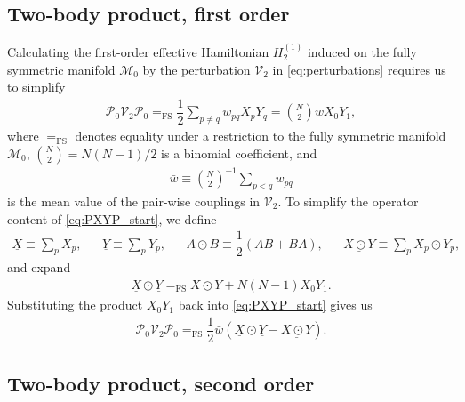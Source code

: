 \documentclass[nofootinbib,notitlepage,11pt]{revtex4-2}
\newcommand{\f}[2]{\dfrac{#1}{#2}} %
\newcommand{\p}[1]{\left(#1\right)} %
\newcommand{\1}{\mathds{1}}
\newcommand{\M}{\mathcal{M}}
\renewcommand{\P}{\mathcal{P}}
\newcommand{\V}{\mathcal{V}}
\newcommand{\EQFS}{=_{\text{FS}}}
\newcommand{\col}{\underline}
\begin{document}
\subsection{Two-body product, first order}
\label{sec:PXYP}

Calculating the first-order effective Hamiltonian $H_2^{(1)}$ induced
on the fully symmetric manifold $\M_0$ by the perturbation $\V_2$ in
\eqref{eq:perturbations} requires us to simplify
\begin{align}
  \P_0 \V_2 \P_0
  \EQFS \f12 \sum_{p\ne q} w_{pq} X_p Y_q
  = {N\choose 2} \bar w X_0 Y_1,
  \label{eq:PXYP_start}
\end{align}
where $\EQFS$ denotes equality under a restriction to the fully
symmetric manifold $\M_0$, ${N\choose2}=N\p{N-1}/2$ is a binomial
coefficient, and
\begin{align}
  \bar w \equiv {N\choose 2}^{-1} \sum_{p<q} w_{pq}
\end{align}
is the mean value of the pair-wise couplings in $\V_2$.  To simplify
the operator content of \eqref{eq:PXYP_start}, we define
\begin{align}
  \col{X} \equiv \sum_p X_p,
  &&
  \col{Y} \equiv \sum_p Y_p,
  &&
  A \odot B \equiv \f12\p{AB+BA},
  &&
  \col{X\odot Y} \equiv \sum_p X_p \odot Y_p,
\end{align}
and expand
\begin{align}
  \col{X}\odot\col{Y} \EQFS \col{X\odot Y} + N\p{N-1} X_0 Y_1.
\end{align}
Substituting the product $X_0 Y_1$ back into \eqref{eq:PXYP_start}
gives us
\begin{align}
  \P_0 \V_2 \P_0
  \EQFS \f12 \bar w \p{\col{X}\odot\col{Y} - \col{X\odot Y}}.
\end{align}

\subsection{Two-body product, second order}
\label{sec:PXYXYP}
\end{document}

